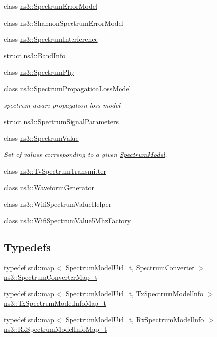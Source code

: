 \begin{DoxyCompactItemize}
class \hyperlink{classns3_1_1SpectrumErrorModel}{ns3\+::\+Spectrum\+Error\+Model}
\item 
class \hyperlink{classns3_1_1ShannonSpectrumErrorModel}{ns3\+::\+Shannon\+Spectrum\+Error\+Model}
\item 
class \hyperlink{classns3_1_1SpectrumInterference}{ns3\+::\+Spectrum\+Interference}
\item 
struct \hyperlink{structns3_1_1BandInfo}{ns3\+::\+Band\+Info}
\item 
class \hyperlink{classns3_1_1SpectrumPhy}{ns3\+::\+Spectrum\+Phy}
\item 
class \hyperlink{classns3_1_1SpectrumPropagationLossModel}{ns3\+::\+Spectrum\+Propagation\+Loss\+Model}
\begin{DoxyCompactList}\small\item\em spectrum-\/aware propagation loss model \end{DoxyCompactList}\item 
struct \hyperlink{structns3_1_1SpectrumSignalParameters}{ns3\+::\+Spectrum\+Signal\+Parameters}
\item 
class \hyperlink{classns3_1_1SpectrumValue}{ns3\+::\+Spectrum\+Value}
\begin{DoxyCompactList}\small\item\em Set of values corresponding to a given \hyperlink{classns3_1_1SpectrumModel}{Spectrum\+Model}. \end{DoxyCompactList}\item 
class \hyperlink{classns3_1_1TvSpectrumTransmitter}{ns3\+::\+Tv\+Spectrum\+Transmitter}
\item 
class \hyperlink{classns3_1_1WaveformGenerator}{ns3\+::\+Waveform\+Generator}
\item 
class \hyperlink{classns3_1_1WifiSpectrumValueHelper}{ns3\+::\+Wifi\+Spectrum\+Value\+Helper}
\item 
class \hyperlink{classns3_1_1WifiSpectrumValue5MhzFactory}{ns3\+::\+Wifi\+Spectrum\+Value5\+Mhz\+Factory}
\end{DoxyCompactItemize}
\subsection*{Typedefs}
\begin{DoxyCompactItemize}
\item 
typedef std\+::map$<$ Spectrum\+Model\+Uid\+\_\+t, Spectrum\+Converter $>$ \hyperlink{group__spectrum_ga47089dbfa7f7955f2b2082c1da395450}{ns3\+::\+Spectrum\+Converter\+Map\+\_\+t}
\item 
typedef std\+::map$<$ Spectrum\+Model\+Uid\+\_\+t, Tx\+Spectrum\+Model\+Info $>$ \hyperlink{group__spectrum_ga3b72b7d13697ed8fe482072a7096c289}{ns3\+::\+Tx\+Spectrum\+Model\+Info\+Map\+\_\+t}
\item 
typedef std\+::map$<$ Spectrum\+Model\+Uid\+\_\+t, Rx\+Spectrum\+Model\+Info $>$ \hyperlink{group__spectrum_ga801b24c7ce914a3fc46a57a68bae76ee}{ns3\+::\+Rx\+Spectrum\+Model\+Info\+Map\+\_\+t}
\end{DoxyCompactItemize}
